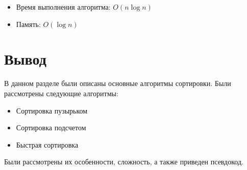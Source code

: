 \begin{itemize}
    \item Время выполнения алгоритма: $O(n \log n)$
    \item Память: $O(\log n)$
\end{itemize}

\section*{Вывод}

В данном разделе были описаны основные алгоритмы сортировки.
Были рассмотрены следующие алгоритмы:
\begin{itemize}
    \item Сортировка пузырьком
    \item Сортировка подсчетом
    \item Быстрая сортировка
\end{itemize}

Были рассмотрены их особенности, сложность, а также приведен псевдокод.